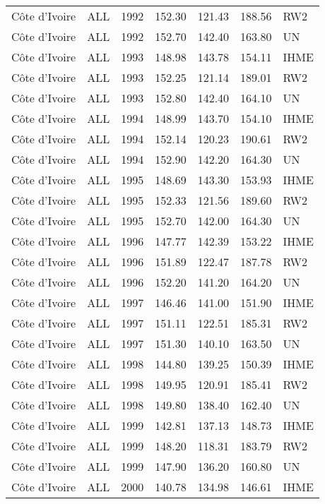 \begin{longtable}{lllrrrl}
  C\^{o}te d'Ivoire & ALL & 1992 & 152.30 & 121.43 & 188.56 & RW2 \\ 
  C\^{o}te d'Ivoire & ALL & 1992 & 152.70 & 142.40 & 163.80 & UN \\ 
  C\^{o}te d'Ivoire & ALL & 1993 & 148.98 & 143.78 & 154.11 & IHME \\ 
  C\^{o}te d'Ivoire & ALL & 1993 & 152.25 & 121.14 & 189.01 & RW2 \\ 
  C\^{o}te d'Ivoire & ALL & 1993 & 152.80 & 142.40 & 164.10 & UN \\ 
  C\^{o}te d'Ivoire & ALL & 1994 & 148.99 & 143.70 & 154.10 & IHME \\ 
  C\^{o}te d'Ivoire & ALL & 1994 & 152.14 & 120.23 & 190.61 & RW2 \\ 
  C\^{o}te d'Ivoire & ALL & 1994 & 152.90 & 142.20 & 164.30 & UN \\ 
  C\^{o}te d'Ivoire & ALL & 1995 & 148.69 & 143.30 & 153.93 & IHME \\ 
  C\^{o}te d'Ivoire & ALL & 1995 & 152.33 & 121.56 & 189.60 & RW2 \\ 
  C\^{o}te d'Ivoire & ALL & 1995 & 152.70 & 142.00 & 164.30 & UN \\ 
  C\^{o}te d'Ivoire & ALL & 1996 & 147.77 & 142.39 & 153.22 & IHME \\ 
  C\^{o}te d'Ivoire & ALL & 1996 & 151.89 & 122.47 & 187.78 & RW2 \\ 
  C\^{o}te d'Ivoire & ALL & 1996 & 152.20 & 141.20 & 164.20 & UN \\ 
  C\^{o}te d'Ivoire & ALL & 1997 & 146.46 & 141.00 & 151.90 & IHME \\ 
  C\^{o}te d'Ivoire & ALL & 1997 & 151.11 & 122.51 & 185.31 & RW2 \\ 
  C\^{o}te d'Ivoire & ALL & 1997 & 151.30 & 140.10 & 163.50 & UN \\ 
  C\^{o}te d'Ivoire & ALL & 1998 & 144.80 & 139.25 & 150.39 & IHME \\ 
  C\^{o}te d'Ivoire & ALL & 1998 & 149.95 & 120.91 & 185.41 & RW2 \\ 
  C\^{o}te d'Ivoire & ALL & 1998 & 149.80 & 138.40 & 162.40 & UN \\ 
  C\^{o}te d'Ivoire & ALL & 1999 & 142.81 & 137.13 & 148.73 & IHME \\ 
  C\^{o}te d'Ivoire & ALL & 1999 & 148.20 & 118.31 & 183.79 & RW2 \\ 
  C\^{o}te d'Ivoire & ALL & 1999 & 147.90 & 136.20 & 160.80 & UN \\ 
  C\^{o}te d'Ivoire & ALL & 2000 & 140.78 & 134.98 & 146.61 & IHME \\ 

\end{longtable}
